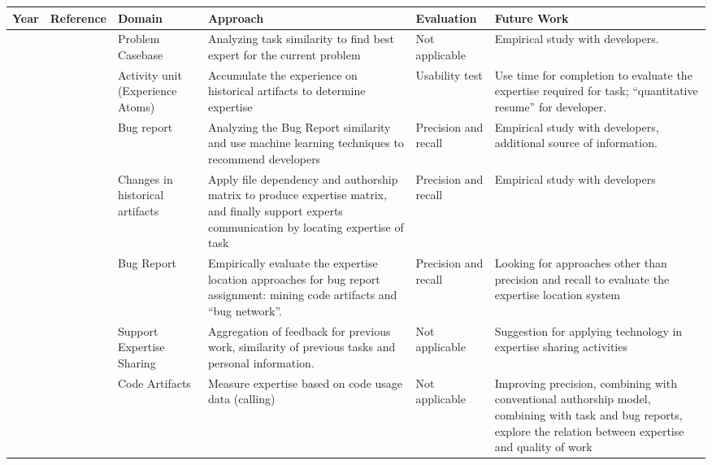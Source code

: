 \begin{table}
\centering
\scriptsize
\settowidth{}
\begin{tabulary}{\textwidth}{|LLLLLL|}
\hline
\textbf{Year}           & \textbf{Reference}          & \textbf{Domain}  &\textbf{Approach}  & \textbf{Evaluation}  & \textbf{Future Work}\\ \hline
\citeyear{mcdonald2000expertise} & \citeauthor{mcdonald2000expertise}\cite{mcdonald2000expertise} & Problem Casebase & Analyzing task similarity to find best expert for the current problem & Not applicable & Empirical study with developers.\\ \hline
\citeyear{mockus2002expertise} & \citeauthor{mockus2002expertise}\cite{mockus2002expertise} & Activity unit (Experience Atoms) & Accumulate the experience on historical artifacts to determine expertise & Usability test & Use time for completion to evaluate the expertise required for task; ``quantitative resume'' for developer.\\ \hline
\citeyear{Anvik2006who} & \citeauthor{Anvik2006who}\cite{Anvik2006who} & Bug report & Analyzing the Bug Report similarity and use machine learning techniques to recommend developers & Precision and recall & Empirical study with developers, additional source of information.\\ \hline
\citeyear{minto2007recommending} & \citeauthor{minto2007recommending}\cite{minto2007recommending} & Changes in historical artifacts & Apply file dependency and authorship matrix to produce expertise matrix, and finally support experts communication by locating expertise of task & Precision and recall & Empirical study with developers\\ \hline
\citeyear{anvik2007determining} & \citeauthor{anvik2007determining}\cite{anvik2007determining} & Bug Report & Empirically evaluate the expertise location approaches for bug report assignment: mining code artifacts and ``bug network''. & Precision and recall & Looking for approaches other than precision and recall to evaluate the expertise location system\\ \hline
\citeyear{Reichling2007} & \citeauthor{Reichling2007}\cite{Reichling2007} & Support Expertise Sharing & Aggregation of feedback for previous work, similarity of previous tasks and personal information. & Not applicable & Suggestion for applying technology in expertise sharing activities\\ \hline
\citeyear{schuler2008mining} & \citeauthor{schuler2008mining}\cite{schuler2008mining} & Code Artifacts & Measure expertise based on code usage data (calling) & Not applicable & Improving precision, combining with conventional authorship model, combining with task and bug reports, explore the relation between expertise and quality of work\\ \hline

\end{tabulary}
\end{table}
